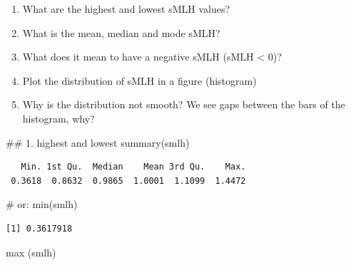 \documentclass[
  letterpaper,
  DIV=11,
  numbers=noendperiod]{scrreprt}
\newenvironment{Shaded}{}{}
\newcommand{\CommentTok}[1]{\textcolor[rgb]{0.42,0.45,0.49}{#1}}
\newcommand{\DocumentationTok}[1]{\textcolor[rgb]{0.42,0.45,0.49}{#1}}
\newcommand{\FunctionTok}[1]{\textcolor[rgb]{0.44,0.26,0.76}{#1}}
\newcommand{\NormalTok}[1]{\textcolor[rgb]{0.14,0.16,0.18}{#1}}
\providecommand{\tightlist}{%
  \setlength{\itemsep}{0pt}\setlength{\parskip}{0pt}}\usepackage{longtable,booktabs,array}
\begin{document}
\begin{enumerate}
\def\labelenumi{\arabic{enumi}.}
\tightlist
\item
  What are the highest and lowest sMLH values?
\item
  What is the mean, median and mode sMLH?
\item
  What does it mean to have a negative sMLH (sMLH \textless{} 0)?
\item
  Plot the distribution of sMLH in a figure (histogram)
\item
  Why is the distribution not smooth? We see gaps between the bars of
  the histogram, why?
\end{enumerate}

\begin{tcolorbox}[enhanced jigsaw, arc=.35mm, left=2mm, titlerule=0mm, rightrule=.15mm, colframe=quarto-callout-tip-color-frame, coltitle=black, colback=white, opacityback=0, bottomtitle=1mm, bottomrule=.15mm, colbacktitle=quarto-callout-tip-color!10!white, breakable, title=\textcolor{quarto-callout-tip-color}{\faLightbulb}\hspace{0.5em}{Code and answer}, toptitle=1mm, toprule=.15mm, opacitybacktitle=0.6, leftrule=.75mm]

\begin{Shaded}
\begin{Highlighting}[]
\DocumentationTok{\#\# 1. highest and lowest}
\FunctionTok{summary}\NormalTok{(smlh) }
\end{Highlighting}
\end{Shaded}

\begin{verbatim}
   Min. 1st Qu.  Median    Mean 3rd Qu.    Max. 
 0.3618  0.8632  0.9865  1.0001  1.1099  1.4472 
\end{verbatim}

\begin{Shaded}
\begin{Highlighting}[]
\CommentTok{\# or:}
\FunctionTok{min}\NormalTok{(smlh)}
\end{Highlighting}
\end{Shaded}

\begin{verbatim}
[1] 0.3617918
\end{verbatim}

\begin{Shaded}
\begin{Highlighting}[]
\FunctionTok{max}\NormalTok{ (smlh)}
\end{Highlighting}
\end{Shaded}


\end{tcolorbox}
\end{document}
